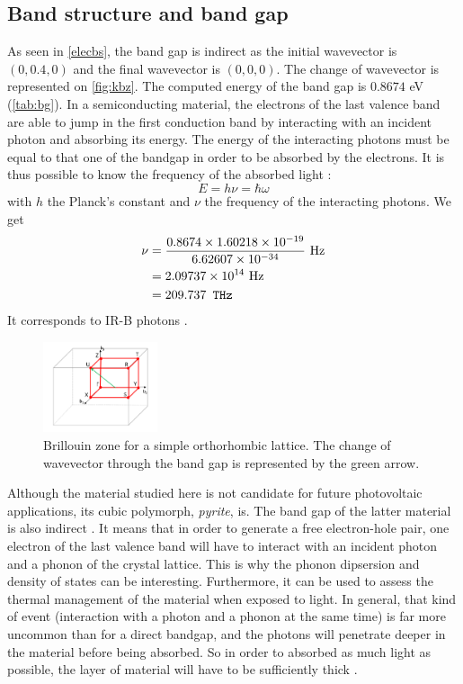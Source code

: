 \documentclass[11pt,a4paper]{article}
\begin{document}
\subsection{Band structure and band gap}
As seen in \autoref{elecbs}, the band gap is indirect as the initial wavevector is $(0, 0.4, 0)$ and the final wavevector is $(0, 0, 0)$. The change of wavevector is represented on \autoref{fig:kbz}. The computed energy of the band gap is $0.8674$ eV (\autoref{tab:bg}). In a semiconducting material, the electrons of the last valence band are able to jump in the first conduction band by interacting with an incident photon and absorbing its energy. The energy of the interacting photons must be equal to that one of the bandgap in order to be absorbed by the electrons. It is thus possible to know the frequency of the absorbed light : 
\begin{equation}
\label{bgE}
E = h\nu = \hbar \omega
\end{equation}
with $h$ the Planck's constant and $\nu$ the frequency of the interacting photons. We get 
\begin{align}
\label{angfreq}
\nu &= \dfrac{0.8674\times 1.60218\times 10^{-19}}{6.62607\times 10^{-34}}\text{ Hz}\\
&= 2.09737\times 10^{14}\text{\space Hz}\\
&=209.737 \texttt{\space THz}
\end{align}
It corresponds to IR-B photons \cite{irb}.
\begin{figure}
\centering
\includegraphics[width=0.3\textwidth]{images/kbz}
\caption{Brillouin zone for a simple orthorhombic lattice. The change of wavevector through the band gap is represented by the green arrow.}
\label{fig:kbz}
\end{figure}

Although the material studied here is not candidate for future photovoltaic applications, its cubic polymorph, \textit{pyrite}, is. The band gap of the latter material is also indirect \cite{MaterialsProjectPyrite}. It means that in order to generate a free electron-hole pair, one electron of the last valence band will have to interact with an incident photon and a phonon of the crystal lattice. This is why the phonon dipsersion and density of states can be interesting. Furthermore, it can be used to assess the thermal management of the material when exposed to light. 
In general, that kind of event (interaction with a photon and a phonon at the same time) is far more uncommon than for a direct bandgap, and the photons will penetrate deeper in the material before being absorbed. So in order to absorbed as much light as possible, the layer of material will have to be sufficiently thick \cite{gaps}.
\end{document}
